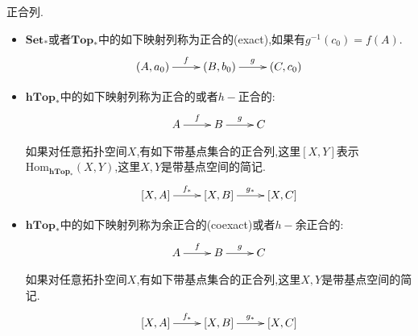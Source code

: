 正合列.
\begin{itemize}
	\item $\textbf{Set}_*$或者$\textbf{Top}_*$中的如下映射列称为正合的(exact),如果有$g^{-1}(c_0)=f(A)$.
	$$\xymatrix{(A,a_0)\ar[r]^f&(B,b_0)\ar[r]^g&(C,c_0)}$$
	\item $\textbf{hTop}_*$中的如下映射列称为正合的或者$h-$正合的:
	$$\xymatrix{A\ar[r]^f&B\ar[r]^g&C}$$
	
	如果对任意拓扑空间$X$,有如下带基点集合的正合列,这里$[X,Y]$表示$\mathrm{Hom}_{\textbf{hTop}_*}(X,Y)$,这里$X,Y$是带基点空间的简记.
	$$\xymatrix{[X,A]\ar[r]^{f_*}&[X,B]\ar[r]^{g_*}&[X,C]}$$
	\item $\textbf{hTop}_*$中的如下映射列称为余正合的(coexact)或者$h-$余正合的:
	$$\xymatrix{A\ar[r]^f&B\ar[r]^g&C}$$
	
	如果对任意拓扑空间$X$,有如下带基点集合的正合列,这里$X,Y$是带基点空间的简记.
	$$\xymatrix{[X,A]\ar[r]^{f_*}&[X,B]\ar[r]^{g_*}&[X,C]}$$
\end{itemize}

